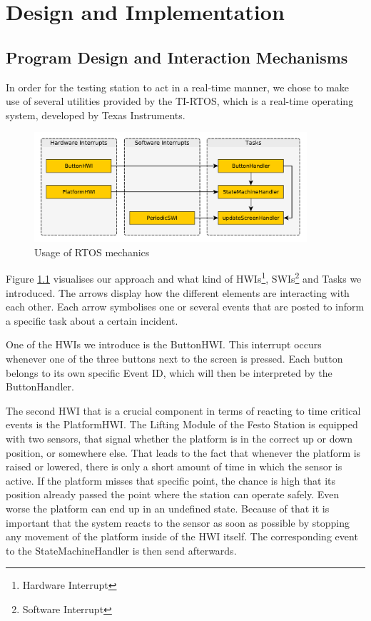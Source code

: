 \chapter{Design and Implementation} %

\section{Program Design and Interaction Mechanisms} %
In order for the testing station to act in a real-time manner, we chose to make use of several utilities provided by the TI-RTOS, which is a real-time operating system, developed by Texas Instruments.

\begin{figure}[H]
	\begin{center}
		\includegraphics[width=0.9\textwidth]{media/RTOS.pdf} 	
		\caption{Usage of RTOS mechanics}
		\label{fig:rtos}
	\end{center}
\end{figure}

Figure \ref{fig:rtos} visualises our approach and what kind of HWIs\footnote{Hardware Interrupt}, SWIs\footnote{Software Interrupt} and Tasks we introduced.
The arrows display how the different elements are interacting with each other.
Each arrow symbolises one or several events that are posted to inform a specific task about a certain incident.

One of the HWIs we introduce is the ButtonHWI.
This interrupt occurs whenever one of the three buttons next to the screen is pressed.
Each button belongs to its own specific Event ID, which will then be interpreted by the ButtonHandler.

The second HWI that is a crucial component in terms of reacting to time critical events is the PlatformHWI.
The Lifting Module of the Festo Station is equipped with two sensors, that signal whether the platform is in the correct up or down position, or somewhere else.
That leads to the fact that whenever the platform is raised or lowered, there is only a short amount of time in which the sensor is active.
If the platform misses that specific point, the chance is high that its position already passed the point where the station can operate safely.
Even worse the platform can end up in an undefined state.
Because of that it is important that the system reacts to the sensor as soon as possible by stopping any movement of the platform inside of the HWI itself.
The corresponding event to the StateMachineHandler is then send afterwards.

